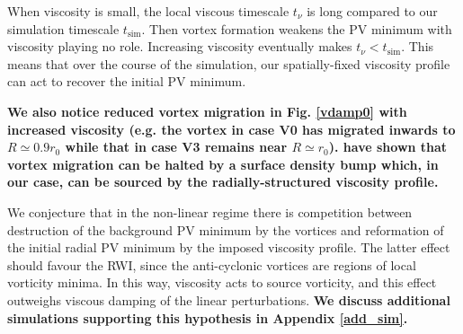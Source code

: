When viscosity is small, the local viscous timescale $t_\nu$ is long compared to our
simulation timescale $t_\mathrm{sim}$. Then vortex formation weakens the PV minimum
with viscosity playing no role. Increasing viscosity eventually makes 
$t_\nu<t_\mathrm{sim}$. This means that over the course of the
simulation, our spatially-fixed viscosity profile can act to recover the
initial PV minimum. 

{\bf We also notice reduced vortex migration in Fig. \ref{vdamp0}
  with increased viscosity (e.g. the vortex in case V0 has migrated
  inwards to $R\simeq0.9r_0$ while that in case V3 remains near
  $R\simeq r_0$). \cite{paardekooper10} have shown that vortex migration can be halted by
  a surface density bump which, in our case, can 
  be sourced by the radially-structured viscosity profile.}  

We conjecture that in the non-linear regime there is competition 
between destruction of the background PV minimum by the 
vortices and reformation of the initial radial PV minimum by the
imposed viscosity profile. The latter effect should favour the RWI,
since the anti-cyclonic vortices are regions of local vorticity
minima. In this way, viscosity acts to source vorticity, and this
effect outweighs viscous damping of the linear perturbations. {\bf We
  discuss additional simulations supporting this hypothesis in
  Appendix \ref{add_sim}.}    

